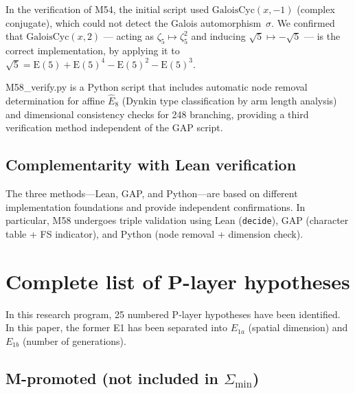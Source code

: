 \documentclass[sn-mathphys-num,Numbered]{sn-jnl}
\theoremstyle{thmstyleone}
\theoremstyle{thmstylethree}
\newcommand{\Amin}{\Sigma_{\min}}
\newcommand{\Ehat}{\hat{E}}
\begin{document}
\begin{appendices}
In the verification of M54, the initial script used
$\mathrm{GaloisCyc}(x, -1)$ (complex conjugate), which could not detect the
Galois automorphism~$\sigma$.  We confirmed that $\mathrm{GaloisCyc}(x, 2)$
--- acting as $\zeta_5 \mapsto \zeta_5^2$ and inducing $\sqrt{5} \mapsto
-\sqrt{5}$ --- is the correct implementation, by applying it to $\sqrt{5} =
\mathrm{E}(5) + \mathrm{E}(5)^4 - \mathrm{E}(5)^2 - \mathrm{E}(5)^3$.

M58\_verify.py is a Python script that includes automatic node removal
determination for affine $\Ehat_8$ (Dynkin type classification by arm length
analysis) and dimensional consistency checks for 248 branching, providing a
third verification method independent of the GAP script.


\subsection{Complementarity with Lean verification}

The three methods---Lean, GAP, and Python---are based on different
implementation foundations and provide independent confirmations.  In
particular, M58 undergoes triple validation using Lean (\texttt{decide}), GAP
(character table + FS indicator), and Python (node removal + dimension check).


\section{Complete list of P-layer hypotheses}\label{app:Phypotheses}

In this research program, 25 numbered P-layer hypotheses have been identified.
In this paper, the former E1 has been separated into $E_{1a}$ (spatial
dimension) and $E_{1b}$ (number of generations).

\subsection{M-promoted (not included in $\Amin$)}


\end{appendices}
\end{document}
